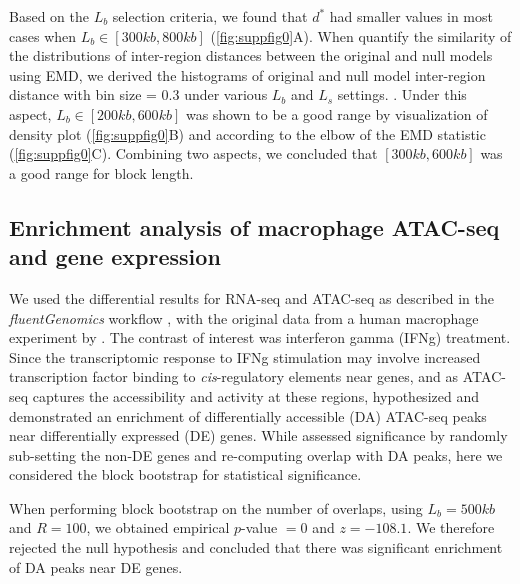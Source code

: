 \documentclass{article}
\begin{document}
 

Based on the $L_b$ selection criteria, we found that $d^*$ had
smaller values in most cases when $L_b \in [300kb,800kb]$
(\cref{fig:suppfig0}A). When quantify the similarity of the distributions of
inter-region distances between the original and 
null models using EMD, we derived the histograms of
original and
null model inter-region distance with bin size = 0.3 under various $L_b$ and $L_s$ settings.  
. Under this aspect, $L_b \in [200kb,600kb]$ was
shown to be a good range by visualization of density plot
(\cref{fig:suppfig0}B) and according to the elbow of the EMD statistic
(\cref{fig:suppfig0}C). Combining two aspects, we concluded that $[300kb,600kb]$ was a good range for block length.

\subsection{Enrichment analysis of macrophage ATAC-seq and gene expression}\label{sec:splines}

We used the differential results for RNA-seq and ATAC-seq as
described in the \textit{fluentGenomics} workflow \citep{lee2020fluent}, with
the original data from a human macrophage experiment by \citet{alasoo2018shared}.
The contrast of interest was interferon gamma (IFNg) treatment. Since the
transcriptomic response to IFNg stimulation may involve increased
transcription factor binding to \textit{cis}-regulatory elements near
genes, and as ATAC-seq captures the accessibility and activity at
these regions, \citet{lee2020fluent} hypothesized and demonstrated an
enrichment of differentially accessible (DA) ATAC-seq peaks near
differentially expressed (DE) genes. While \citet{lee2020fluent}
assessed significance by randomly sub-setting the non-DE genes and
re-computing overlap with DA peaks, here we considered the block
bootstrap for statistical significance.

When performing block bootstrap on the number of overlaps,
using $L_b = 500kb$ and $R = 100$,
we obtained empirical $\textit{p}$-value $=0$ and $z = -108.1$.
We therefore rejected the null hypothesis and concluded that there was
significant enrichment of DA peaks near DE genes.
\end{document}
